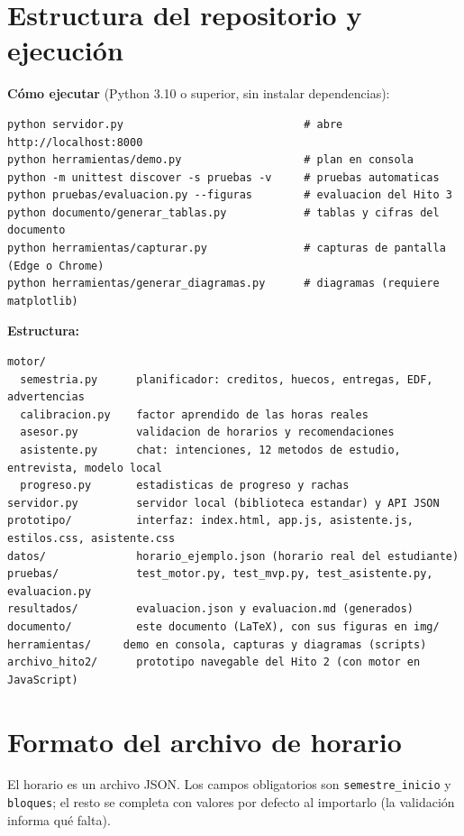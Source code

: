\appendix

\section{Estructura del repositorio y ejecución}\label{anexo:estructura}

\textbf{Cómo ejecutar} (Python 3.10 o superior, sin instalar dependencias):

\begin{verbatim}
python servidor.py                            # abre http://localhost:8000
python herramientas/demo.py                   # plan en consola
python -m unittest discover -s pruebas -v     # pruebas automaticas
python pruebas/evaluacion.py --figuras        # evaluacion del Hito 3
python documento/generar_tablas.py            # tablas y cifras del documento
python herramientas/capturar.py               # capturas de pantalla (Edge o Chrome)
python herramientas/generar_diagramas.py      # diagramas (requiere matplotlib)
\end{verbatim}

\textbf{Estructura:}

\begin{verbatim}
motor/
  semestria.py      planificador: creditos, huecos, entregas, EDF, advertencias
  calibracion.py    factor aprendido de las horas reales
  asesor.py         validacion de horarios y recomendaciones
  asistente.py      chat: intenciones, 12 metodos de estudio, entrevista, modelo local
  progreso.py       estadisticas de progreso y rachas
servidor.py         servidor local (biblioteca estandar) y API JSON
prototipo/          interfaz: index.html, app.js, asistente.js, estilos.css, asistente.css
datos/              horario_ejemplo.json (horario real del estudiante)
pruebas/            test_motor.py, test_mvp.py, test_asistente.py, evaluacion.py
resultados/         evaluacion.json y evaluacion.md (generados)
documento/          este documento (LaTeX), con sus figuras en img/
herramientas/     demo en consola, capturas y diagramas (scripts)
archivo_hito2/      prototipo navegable del Hito 2 (con motor en JavaScript)
\end{verbatim}

\section{Formato del archivo de horario}

El horario es un archivo JSON. Los campos obligatorios son \texttt{semestre\_inicio} y \texttt{bloques}; el resto se completa con valores por defecto al importarlo (la validación informa qué falta).

